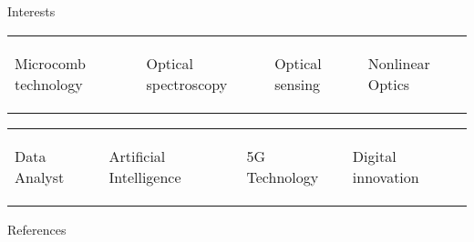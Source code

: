 \documentclass[letterpaper, 11pt]{article}[leftmargin=*]
\renewcommand{\section}[2]{
  \colorbox{boxcol}{\color{secondary}\raggedbottom\normalsize{#1}{\hspace{2pt}#2}}
}
\newcommand{\resumeEntryStart}{\begin{itemize}[leftmargin=2.5mm]\itemsep8pt}
\newcommand{\resumeEntryEnd}{\end{itemize}}
\newcommand{\resumeEntryS}[2]{
  \item[]\small{
    \textbf{\color{primary}#1 }{ #2 }
  }
}
\newcommand{\fourthcol}[4]{
	\vspace{-0.3cm}
	\begin{tabularx}{\textwidth}{XXXX}
		{\small#1} & {\small#2} & {\small#3} & {\small#4}
	\end{tabularx}
}
\begin{document}
\section{\faThumbTack}{Interests}
\vspace{-0.6cm}
\resumeEntryStart
\footnotesize
\fourthcol{\resumeEntryS{}{\item \footnotesize Microcomb technology}}{\resumeEntryS{}{\item \footnotesize Optical spectroscopy}}{\resumeEntryS{}{\item \footnotesize Optical sensing}}{\resumeEntryS{}{\item \footnotesize Nonlinear Optics}}
\vspace{-0.7cm}
\fourthcol{\resumeEntryS{}{\item \footnotesize Data Analyst}}{\resumeEntryS{}{\item \footnotesize Artificial Intelligence}}{\resumeEntryS{}{\item \footnotesize 5G Technology}}{\resumeEntryS{}{\item \footnotesize Digital innovation}}
\resumeEntryEnd

\section{\faTripadvisor}{References}

\footnotesize
\vspace{4pt}

\end{document}
